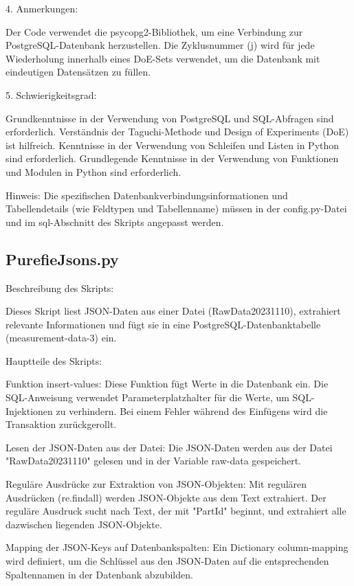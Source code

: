 4. Anmerkungen:

    Der Code verwendet die psycopg2-Bibliothek, um eine Verbindung zur PostgreSQL-Datenbank herzustellen.
    Die Zyklusnummer (j) wird für jede Wiederholung innerhalb eines DoE-Sets verwendet, um die Datenbank mit eindeutigen Datensätzen zu füllen.

5. Schwierigkeitsgrad:

    Grundkenntnisse in der Verwendung von PostgreSQL und SQL-Abfragen sind erforderlich.
    Verständnis der Taguchi-Methode und Design of Experiments (DoE) ist hilfreich.
    Kenntnisse in der Verwendung von Schleifen und Listen in Python sind erforderlich.
    Grundlegende Kenntnisse in der Verwendung von Funktionen und Modulen in Python sind erforderlich.

    Hinweis: Die spezifischen Datenbankverbindungsinformationen und Tabellendetails (wie Feldtypen und Tabellenname) müssen in der config.py-Datei und im sql-Abschnitt des Skripts angepasst werden.

\subsection{PurefieJsons.py}
Beschreibung des Skripts:

Dieses Skript liest JSON-Daten aus einer Datei (RawData20231110), extrahiert relevante Informationen und fügt sie in eine PostgreSQL-Datenbanktabelle (measurement-data-3) ein.

Hauptteile des Skripts:

    Funktion insert-values:
        Diese Funktion fügt Werte in die Datenbank ein. Die SQL-Anweisung verwendet Parameterplatzhalter für die Werte, um SQL-Injektionen zu verhindern.
        Bei einem Fehler während des Einfügens wird die Transaktion zurückgerollt.

    Lesen der JSON-Daten aus der Datei:
        Die JSON-Daten werden aus der Datei "RawData20231110" gelesen und in der Variable raw-data gespeichert.

    Reguläre Ausdrücke zur Extraktion von JSON-Objekten:
        Mit regulären Ausdrücken (re.findall) werden JSON-Objekte aus dem Text extrahiert. Der reguläre Ausdruck sucht nach Text, der mit "PartId" beginnt, und extrahiert alle dazwischen liegenden JSON-Objekte.

    Mapping der JSON-Keys auf Datenbankspalten:
        Ein Dictionary column-mapping wird definiert, um die Schlüssel aus den JSON-Daten auf die entsprechenden Spaltennamen in der Datenbank abzubilden.

